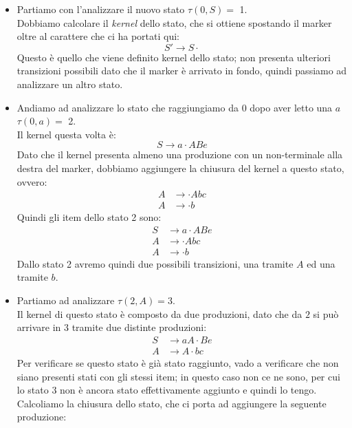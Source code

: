 \documentclass[class=book, crop=false, oneside, 12pt]{standalone}
\begin{document}
\begin{itemize}
    \item Partiamo con l'analizzare il nuovo stato \(\tau (0, S) =\) 1. \\
    Dobbiamo calcolare il \emph{kernel} dello stato, che si ottiene spostando il marker oltre al carattere che ci ha portati qui:
    \begin{equation*}
        S' \to S \cdot
    \end{equation*}
    Questo è quello che viene definito kernel dello stato; non presenta ulteriori transizioni possibili dato che il marker è arrivato in fondo, quindi passiamo ad analizzare un altro stato. 
    \item Andiamo ad analizzare lo stato che raggiungiamo da \(0\) dopo aver letto una \(a\) \(\tau (0, a) =\) 2. \\
    Il kernel questa volta è:
    \begin{equation*}
        S \to a \cdot ABe
    \end{equation*}
    Dato che il kernel presenta almeno una produzione con un non-terminale alla destra del marker, dobbiamo aggiungere la chiusura del kernel a questo stato, ovvero:
    \begin{align*}
        A &\to \cdot Abc\\
        A &\to \cdot b
    \end{align*}
    Quindi gli item dello stato 2 sono:
    \begin{align*}
        S &\to a \cdot ABe\\
        A &\to \cdot Abc\\
        A &\to \cdot b
    \end{align*}
    Dallo stato 2 avremo quindi due possibili transizioni, una tramite \(A\) ed una tramite \(b\).
    \item Partiamo ad analizzare \(\tau (2, A) = 3\). \\
    Il kernel di questo stato è composto da due produzioni, dato che da \(2\) si può arrivare in \(3\) tramite due distinte produzioni:
    \begin{align*}
        S &\to aA \cdot Be \\
        A &\to A \cdot bc
    \end{align*}
    Per verificare se questo stato è già stato raggiunto, vado a verificare che non siano presenti stati con gli stessi item; in questo caso non ce ne sono, per cui lo stato \(3\) non è ancora stato effettivamente aggiunto e quindi lo tengo. Calcoliamo la chiusura dello stato, che ci porta ad aggiungere la seguente produzione:

\end{itemize}
\end{document}

